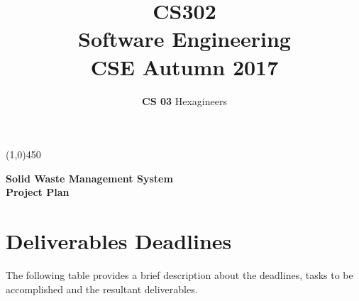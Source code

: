 \documentclass{article}
\title{\textbf{CS302}\\\HUGE Software Engineering\\
\LARGE CSE\hspace{\labelsep}\textbullet\hspace{\labelsep} Autumn 2017
}
\author{\textbf{CS 03} Hexagineers}
\begin{document}
\maketitle
\line(1,0){450}

\begin{center}

\Huge\textbf{Solid Waste Management System}\\
\Large \textbf{Project Plan}
\end{center}
\newpage
\tableofcontents
\newpage
\section{Deliverables Deadlines}
\par The following table provides a brief description about the deadlines, tasks to be accomplished and the resultant deliverables.
\end{document}
